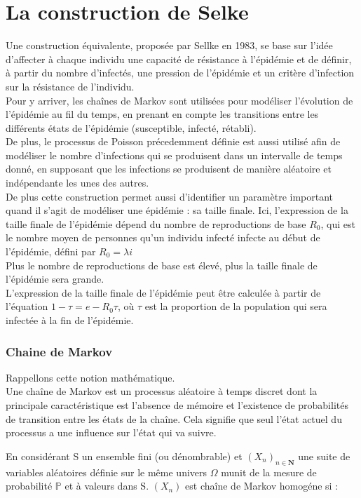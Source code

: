 \section{La construction de Selke}

Une construction équivalente, proposée par Sellke en 1983, se base sur l’idée d’affecter à chaque individu une capacité de résistance à l’épidémie et de définir, à partir du nombre d’infectés, une pression de l’épidémie et un critère d’infection sur la résistance de l’individu. \\
Pour y arriver, les chaînes de Markov sont utilisées pour modéliser l’évolution de l’épidémie au fil du temps, en prenant en compte les transitions entre les différents états de l’épidémie (susceptible, infecté, rétabli). \\
De plus, le processus de Poisson précedemment définie est aussi utilisé afin de modéliser le nombre d’infections qui se produisent dans un intervalle de temps donné, en supposant que les infections se produisent de manière aléatoire et indépendante les unes des autres.\\

De plus cette construction permet aussi d’identifier un paramètre important quand il s’agit de modéliser une épidémie : sa taille finale. Ici, l’expression de la taille finale de l’épidémie dépend du nombre de reproductions de base $R_0$, qui est le nombre moyen de personnes qu’un individu infecté infecte au début de l’épidémie, défini par $R_0 = \lambda i$\\
Plus le nombre de reproductions de base est élevé, plus la taille finale de l’épidémie sera grande.\\
L’expression de la taille finale de l’épidémie peut être calculée à partir de l’équation $1 - \tau = e - R_0\tau$, où $\tau$ est la proportion de la population qui sera infectée à la fin de l’épidémie.


\subsubsection{Chaine de Markov}
Rappellons cette notion mathématique.\\
Une chaîne de Markov est un processus aléatoire à temps discret dont la principale caractéristique est l’absence de mémoire et l’existence de probabilités de transition entre les états de la chaîne. Cela signifie que seul l’état actuel du processus a une influence sur l’état qui va suivre.

En considérant S un ensemble fini (ou dénombrable) et $(X_n)_{n \in \boldsymbol{N}}$ une suite de variables aléatoires définie sur le même univers $\Omega$ munit de la mesure de probabilité $\mathbb{P}$ et à valeurs dans S. $(X_n)$ est chaîne de Markov homogéne si :

